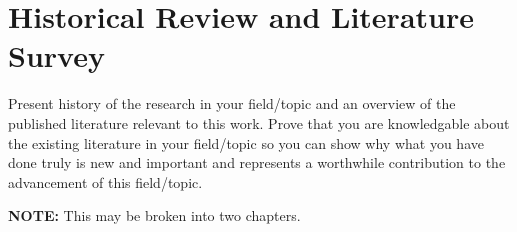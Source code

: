 \chapter{Historical Review and Literature Survey}\label{chap:history}

Present history of the research in your field/topic and an overview of the published literature relevant to this work. Prove that you are knowledgable about the existing literature in your field/topic so you can show why what you have done truly is new and important and represents a worthwhile contribution to the advancement of this field/topic. 

\textbf{NOTE:} This may be broken into two chapters.
\endinput
